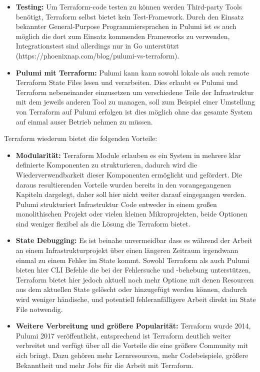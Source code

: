 \begin{spacing}{1.2}
\begin{itemize}
  \item \textbf{Testing:} Um Terraform-code testen zu können werden
  Third-party Tools benötigt, Terraform selbst bietet kein Test-Framework.
  Durch den Einsatz bekannter General-Purpose Programmiersprachen in Pulumi
  ist es auch möglich die dort zum Einsatz kommenden Frameworks zu verwenden,
  Integrationstest sind allerdings nur in Go unterstützt
  (https://phoenixnap.com/blog/pulumi-vs-terraform).
  
  \item \textbf{Pulumi mit Terraform:} Pulumi kann kann sowohl lokale als auch
  remote Terraform State Files lesen und verarbeiten. Dies erlaubt es Pulumi
  und Terraform nebeneinander einzusetzen um verschiedene Teile der
  Infrastruktur mit dem jeweils anderen Tool zu managen, soll zum Beispiel 
  einer Umstellung von Terraform auf Pulumi erfolgen ist dies möglich
  ohne das gesamte System auf einmal auser Betrieb nehmen zu müssen.

\end{itemize}

Terraform wiederum bietet die folgenden Vorteile:

\begin{itemize}
  \item \textbf{Modularität:} Terraform Module erlauben es ein System in
  mehrere klar definierte Komponenten zu strukturieren, dadurch wird die
  Wiederverwendbarkeit dieser Komponenten ermöglicht und gefördert.
  Die daraus resultierenden Vorteile wurden bereits in den vorangegangenen
  Kapiteln dargelegt, daher soll hier nicht weiter darauf eingegangen werden.
  Pulumi strukturiert Infrastruktur Code entweder in einem großen
  monolithischen Projekt oder vielen kleinen Mikroprojekten, beide
  Optionen sind weniger flexibel als die Lösung die Terraform bietet.

  \item \textbf{State Debugging:} Es ist beinahe unvermeidbar
  dass es während der Arbeit an einem Infrastrukturprojekt über einen
  längeren Zeitraum irgendwann einmal zu einem Fehler im State kommt.
  Sowohl Terraform als auch Pulumi bieten hier CLI Befehle die bei der
  Fehlersuche und -behebung unterstützen, Terraform bietet hier jedoch
  aktuell noch mehr Optione mit denen Resourcen aus dem aktuellen State
  gelöscht oder hinzugefügt werden können, dadurch wird weniger händische,
  und potentiell fehleranfälligere Arbeit direkt im State File notwendig.

  \item \textbf{Weitere Verbreitung und größere Popularität:} Terraform wurde
  2014, Pulumi 2017 veröffentlicht, entsprechend ist Terraform deutlich weiter
  verbreitet und verfügt über all die Vorteile die eine größere Community mit
  sich bringt. Dazu gehören mehr Lernresourcen, mehr Codebeispiele, größere
  Bekanntheit und mehr Jobs für die Arbeit mit Terraform.


\end{itemize}
\end{spacing}
